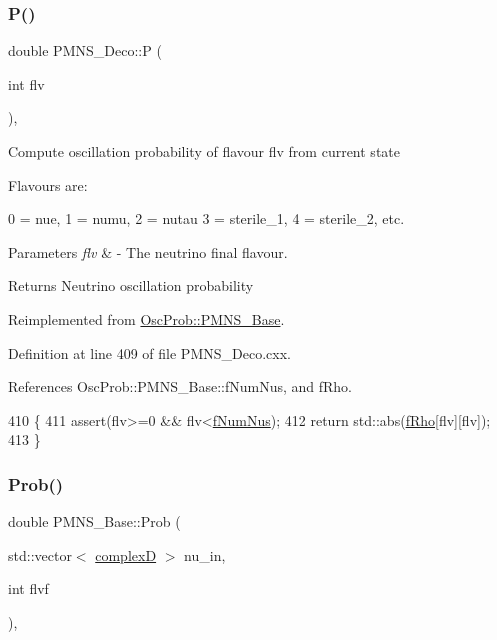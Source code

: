 \subsubsection{\texorpdfstring{P()}{P()}}
{\footnotesize\ttfamily double P\+M\+N\+S\+\_\+\+Deco\+::P (\begin{DoxyParamCaption}\item[{int}]{flv }\end{DoxyParamCaption})\hspace{0.3cm}{\ttfamily [protected]}, {\ttfamily [virtual]}}

Compute oscillation probability of flavour flv from current state

Flavours are\+: 
\begin{DoxyPre}
  0 = nue, 1 = numu, 2 = nutau
  3 = sterile\_1, 4 = sterile\_2, etc.
\end{DoxyPre}
 
\begin{DoxyParams}{Parameters}
{\em flv} & -\/ The neutrino final flavour.\\
\hline
\end{DoxyParams}
\begin{DoxyReturn}{Returns}
Neutrino oscillation probability 
\end{DoxyReturn}


Reimplemented from \hyperlink{classOscProb_1_1PMNS__Base_a0dc4d45bc3d7e03b9abbf5b4e100cc22}{Osc\+Prob\+::\+P\+M\+N\+S\+\_\+\+Base}.



Definition at line 409 of file P\+M\+N\+S\+\_\+\+Deco.\+cxx.



References Osc\+Prob\+::\+P\+M\+N\+S\+\_\+\+Base\+::f\+Num\+Nus, and f\+Rho.


\begin{DoxyCode}
410 \{
411   assert(flv>=0 && flv<\hyperlink{classOscProb_1_1PMNS__Base_a24bb74bed63569dfe88b18fa6a08060e}{fNumNus});
412   \textcolor{keywordflow}{return} std::abs(\hyperlink{classOscProb_1_1PMNS__Deco_a0488d62b4ef4cf5b43425769f5fcdbdf}{fRho}[flv][flv]);
413 \}
\end{DoxyCode}
\mbox{\label{classOscProb_1_1PMNS__Base_aa2e10704d2d205a1ec8988de14b1a66f}} 
\subsubsection{\texorpdfstring{Prob()}{Prob()}\hspace{0.1cm}{\footnotesize\ttfamily [1/6]}}
{\footnotesize\ttfamily double P\+M\+N\+S\+\_\+\+Base\+::\+Prob (\begin{DoxyParamCaption}\item[{std\+::vector$<$ \hyperlink{EigenPoint_8h_a67ca8e107e20610c3fff78d5e726ece0}{complexD} $>$}]{nu\+\_\+in,  }\item[{int}]{flvf }\end{DoxyParamCaption})\hspace{0.3cm}{\ttfamily [virtual]}, {\ttfamily [inherited]}}

